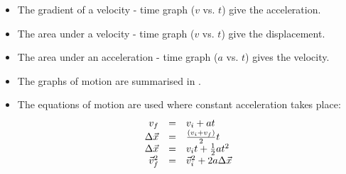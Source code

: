\begin{itemize}[noitemsep]
\label{m38796*uid167}\item The gradient of a velocity - time graph ($v$ vs. $t$) give the acceleration.
\label{m38796*uid168}\item The area under a velocity - time graph ($v$ vs. $t$) give the displacement.
\label{m38796*uid169}\item The area under an acceleration - time graph ($a$ vs. $t$) gives the velocity.
\label{m38796*uid170}\item The graphs of motion are summarised in .
\label{m38796*uid171}\item The equations of motion are used where constant acceleration takes place:
\label{m38796*id81101}\nopagebreak\noindent{}
    \begin{equation*}
    \begin{array}{ccc}\hfill {v}_{f}& =& {v}_{i}+at\hfill \\ \hfill \Delta \vec{x}& =& \frac{\left({v}_{i}+{v}_{f}\right)}{2}t\hfill \\ \hfill \Delta \vec{x}& =& {v}_{i}t+\frac{1}{2}a{t}^{2}\hfill \\ \hfill \vec{v}_{f}^{2}& =& \vec{v}_{i}^{2}+2a\Delta \vec{x}\hfill \end{array}
      \end{equation*}
    \end{itemize}
